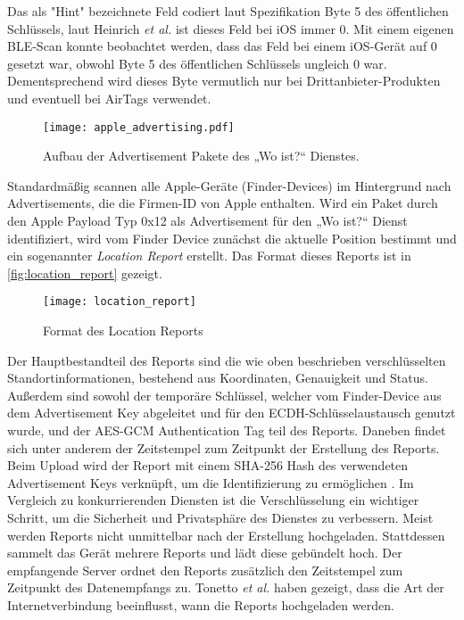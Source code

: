 Das als "Hint" bezeichnete Feld codiert laut Spezifikation \cite{Apple_FindMySpec} Byte 5 des öffentlichen Schlüssels, laut Heinrich \textit{et al.} \cite{Heinrich_FindMy} ist dieses Feld bei iOS immer 0.
Mit einem eigenen \ac{BLE}-Scan konnte beobachtet werden, dass das Feld bei einem iOS-Gerät auf 0 gesetzt war, obwohl Byte 5 des öffentlichen Schlüssels ungleich 0 war.
Dementsprechend wird dieses Byte vermutlich nur bei Drittanbieter-Produkten und eventuell bei AirTags verwendet.
\begin{figure}
    \centering
    \texttt{[image: apple\_advertising.pdf]}
    \caption{Aufbau der Advertisement Pakete des „Wo ist?“ Dienstes.}
    \label{fig:apple_advertising}
\end{figure}

Standardmäßig scannen alle Apple-Geräte (Finder-Devices) im Hintergrund nach Advertisements, die die Firmen-ID von Apple enthalten.
Wird ein Paket durch den Apple Payload Typ 0x12 als Advertisement für den „Wo ist?“ Dienst identifiziert, wird vom Finder Device zunächst die aktuelle Position bestimmt und ein sogenannter \textit{Location Report} erstellt.
Das Format dieses Reports ist in \autoref{fig:location_report} gezeigt.
\begin{figure}
    \centering
    \texttt{[image: location\_report]}
    \caption{Format des Location Reports \cite{Heinrich_FindMy}}
    \label{fig:location_report}
\end{figure}
Der Hauptbestandteil des Reports sind die wie oben beschrieben verschlüsselten Standortinformationen, bestehend aus Koordinaten, Genauigkeit und Status.
Außerdem sind sowohl der temporäre Schlüssel, welcher vom Finder-Device aus dem Advertisement Key abgeleitet und für den \ac{ECDH}-Schlüsselaustausch genutzt wurde, und der \ac{AES}-\ac{GCM} Authentication Tag teil des Reports.
Daneben findet sich unter anderem der Zeitstempel zum Zeitpunkt der Erstellung des Reports.
Beim Upload wird der Report mit einem \ac{SHA}-256 Hash des verwendeten Advertisement Keys verknüpft, um die Identifizierung zu ermöglichen \cite{Heinrich_FindMy}.
Im Vergleich zu konkurrierenden Diensten ist die Verschlüsselung ein wichtiger Schritt, um die Sicherheit und Privatsphäre des Dienstes zu verbessern.
Meist werden Reports nicht unmittelbar nach der Erstellung hochgeladen.
Stattdessen sammelt das Gerät mehrere Reports und lädt diese gebündelt hoch.
Der empfangende Server ordnet den Reports zusätzlich den Zeitstempel zum Zeitpunkt des Datenempfangs zu.
Tonetto \textit{et al.} \cite{Tonetto_FindMy} haben gezeigt, dass die Art der Internetverbindung beeinflusst, wann die Reports hochgeladen werden.
